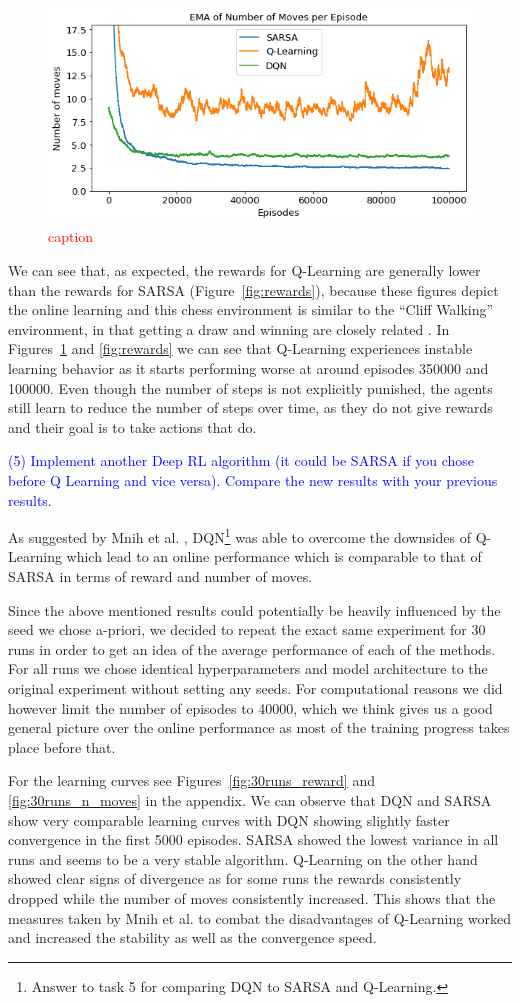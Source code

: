 \documentclass[conference]{IEEEtran}
\begin{document}
\begin{figure}
    \centering
    \includegraphics[width=.45\textwidth]{../figures/ema_number_of_moves_per_episode_comparison.png}
    \caption{\textcolor{red}{caption}}
    \label{fig:n_moves}
\end{figure}


We can see that, as expected, the rewards for Q-Learning are generally lower than the rewards for SARSA (Figure~\ref{fig:rewards}), because these figures depict the online learning and this chess environment is similar to the ``Cliff Walking'' environment, in that getting a draw and winning are closely related \cite{sutton2018}. In Figures~\ref{fig:n_moves} and \ref{fig:rewards} we can see that Q-Learning experiences instable learning behavior as it starts performing worse at around episodes 350000 and 100000. Even though the number of steps is not explicitly punished, the agents still learn to reduce the number of steps over time, as they do not give rewards and their goal is to take actions that do.

\textcolor{blue}{(5) Implement another Deep RL algorithm (it could be SARSA if you chose before Q
Learning and vice versa). Compare the new results with your previous results.}

As suggested by Mnih et al. \cite{atari2013}\cite{dqn2015}, DQN\footnote{Answer to task 5 for comparing DQN to SARSA and Q-Learning.} was able to overcome the downsides of Q-Learning which lead to an online performance which is comparable to that of SARSA in terms of reward and number of moves.

Since the above mentioned results could potentially be heavily influenced by the seed we chose a-priori, we decided to repeat the exact same experiment for 30 runs in order to get an idea of the average performance of each of the methods. For all runs we chose identical hyperparameters and model architecture to the original experiment without setting any seeds. For computational reasons we did however limit the number of episodes to 40000, which we think gives us a good general picture over the online performance as most of the training progress takes place before that.

For the learning curves see Figures~\ref{fig:30runs_reward} and \ref{fig:30runs_n_moves} in the appendix. We can observe that DQN and SARSA show very comparable learning curves with DQN showing slightly faster convergence in the first 5000 episodes. SARSA showed the lowest variance in all runs and seems to be a very stable algorithm. Q-Learning on the other hand showed clear signs of divergence as for some runs the rewards consistently dropped while the number of moves consistently increased. This shows that the measures taken by Mnih et al. \cite{dqn2015} to combat the disadvantages of Q-Learning worked and increased the stability as well as the convergence speed.
\end{document}
